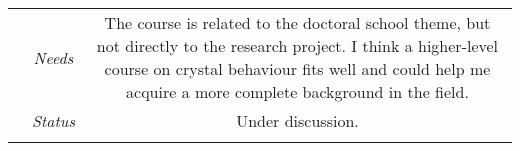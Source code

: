 \begin{table}
\begin{tabularx}{\textwidth}{cccccc}
    &\textit{Needs}&\multicolumn{4}{p{0.7\textwidth}}{The course is related to the doctoral school theme, but not directly to the research project. I think a higher-level course on crystal behaviour fits well and could help me acquire a more complete background in the field.}\\
    &\textit{Status}&\multicolumn{4}{p{0.7\textwidth}}{Under discussion.}\\
    \midrule
    \bottomrule
\label{tab:proposal_tab3} 
\end{tabularx}
\end{table}